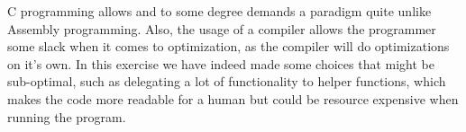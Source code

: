 C programming allows and to some degree demands a paradigm quite unlike Assembly programming. Also, the usage of a compiler allows the programmer some slack when it comes to optimization, as the compiler will do optimizations on it's own. In this exercise we have indeed made some choices that might be sub-optimal, such as delegating a lot of functionality to helper functions, which makes the code more readable for a human but could be resource expensive when running the program.
